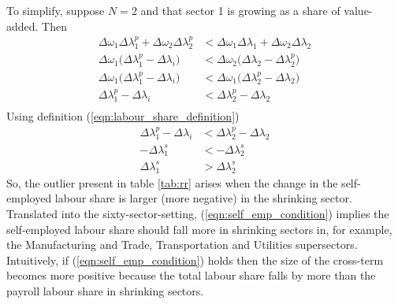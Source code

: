 To simplify, suppose $N = 2$ and that sector 1 is growing as a share of value-added. Then
\begin{equation}
\begin{split}
    \Delta\omega_{1}\Delta\lambda_{1}^{p} + \Delta\omega_{2}\Delta\lambda_{2}^{p} &< \Delta\omega_{1}\Delta\lambda_{1} + \Delta\omega_{2}\Delta\lambda_{2} \\ 
    \Delta\omega_{1}\Big(\Delta\lambda_{1}^{p} - \Delta\lambda_{i}\Big) &< \Delta\omega_{2}\Big(\Delta\lambda_{2} -\Delta\lambda_{2}^{p}\Big) \\ 
    \Delta\omega_{1}\Big(\Delta\lambda_{1}^{p} - \Delta\lambda_{i}\Big) &< \Delta\omega_{1}\Big(\Delta\lambda_{2}^{p} -\Delta\lambda_{2}\Big) \\ 
    \Delta\lambda_{1}^{p} - \Delta\lambda_{i} &< \Delta\lambda_{2}^{p} -\Delta\lambda_{2} \\ 
\end{split}
\end{equation}
Using definition (\ref{eqn:labour_share_definition})
\begin{equation}
\begin{split}
    \Delta\lambda_{1}^{p} - \Delta\lambda_{i} &< \Delta\lambda_{2}^{p} -\Delta\lambda_{2} \\ 
    -\Delta\lambda_{1}^{s} &< -\Delta\lambda_{2}^{s} \\ 
    \Delta\lambda_{1}^{s} &> \Delta\lambda_{2}^{s}
\end{split}
\label{eqn:self_emp_condition}
\end{equation}
So, the outlier present in table \ref{tab:rr} arises when the change in the self-employed labour share is larger (more negative) in the shrinking sector. Translated into the sixty-sector-setting, (\ref{eqn:self_emp_condition}) implies the self-employed labour share should fall more in shrinking sectors in, for example, the Manufacturing and Trade, Transportation and Utilities supersectors. Intuitively, if (\ref{eqn:self_emp_condition}) holds then the size of the cross-term becomes more positive because the total labour share falls by more than the payroll labour share in shrinking sectors. 
